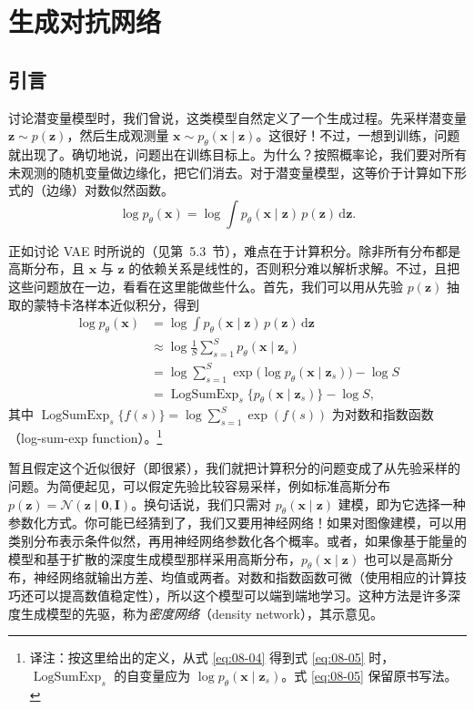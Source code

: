 \chapter{生成对抗网络}
\label{chap:08}

\section{引言}
\label{sec:08-01}

讨论潜变量模型时，我们曾说，这类模型自然定义了一个生成过程。先采样潜变量 $\mathbf z\sim p(\mathbf z)$，然后生成观测量 $\mathbf x\sim p_\theta(\mathbf x\mid\mathbf z)$。这很好！不过，一想到训练，问题就出现了。确切地说，问题出在训练目标上。为什么？按照概率论，我们要对所有未观测的随机变量做边缘化，把它们消去。对于潜变量模型，这等价于计算如下形式的（边缘）对数似然函数。
\begin{equation}
  \log p_\theta(\mathbf x)=\log\int p_\theta(\mathbf x\mid\mathbf z)\,p(\mathbf z)\,\mathrm d\mathbf z.
  \tag{8.1}\label{eq:08-01}
\end{equation}

正如讨论 VAE 时所说的（见第~5.3~节），难点在于计算积分。除非所有分布都是高斯分布，且 $\mathbf x$ 与 $\mathbf z$ 的依赖关系是线性的，否则积分难以解析求解。不过，且把这些问题放在一边，看看在这里能做些什么。首先，我们可以用从先验 $p(\mathbf z)$ 抽取的蒙特卡洛样本近似积分，得到
\begin{align}
  \log p_\theta(\mathbf x)
    &=\log\int p_\theta(\mathbf x\mid\mathbf z)\,p(\mathbf z)\,\mathrm d\mathbf z
      \tag{8.2}\label{eq:08-02}\\
    &\approx\log\frac{1}{S}\sum_{s=1}^{S}p_\theta(\mathbf x\mid\mathbf z_s)
      \tag{8.3}\label{eq:08-03}\\
    &=\log\sum_{s=1}^{S}\exp\bigl(\log p_\theta(\mathbf x\mid\mathbf z_s)\bigr)-\log S
      \tag{8.4}\label{eq:08-04}\\
    &=\operatorname{LogSumExp}_s\{p_\theta(\mathbf x\mid\mathbf z_s)\}-\log S,
      \tag{8.5}\label{eq:08-05}
\end{align}
其中 $\operatorname{LogSumExp}_s\{f(s)\}=\log\sum_{s=1}^{S}\exp(f(s))$ 为对数和指数函数（log-sum-exp function）。\footnote{译注：按这里给出的定义，从式 \eqref{eq:08-04} 得到式 \eqref{eq:08-05} 时，$\operatorname{LogSumExp}_s$ 的自变量应为 $\log p_\theta(\mathbf x\mid\mathbf z_s)$。式 \eqref{eq:08-05} 保留原书写法。}

暂且假定这个近似很好（即很紧），我们就把计算积分的问题变成了从先验采样的问题。为简便起见，可以假定先验比较容易采样，例如标准高斯分布 $p(\mathbf z)=\mathcal N(\mathbf z\mid\mathbf 0,\mathbf I)$。换句话说，我们只需对 $p_\theta(\mathbf x\mid\mathbf z)$ 建模，即为它选择一种参数化方式。你可能已经猜到了，我们又要用神经网络！如果对图像建模，可以用类别分布表示条件似然，再用神经网络参数化各个概率。或者，如果像基于能量的模型和基于扩散的深度生成模型那样采用高斯分布，$p_\theta(\mathbf x\mid\mathbf z)$ 也可以是高斯分布，神经网络就输出方差、均值或两者。对数和指数函数可微（使用相应的计算技巧还可以提高数值稳定性），所以这个模型可以端到端地学习。这种方法是许多深度生成模型的先驱，称为\emph{密度网络}（density network），其示意见。

